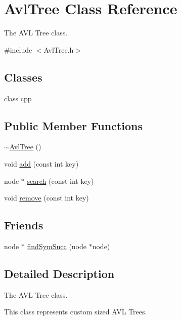 \hypertarget{classAvlTree}{\section{Avl\-Tree Class Reference}
\label{classAvlTree}
}


The A\-V\-L Tree class.  




{\ttfamily \#include $<$Avl\-Tree.\-h$>$}

\subsection*{Classes}
\begin{DoxyCompactItemize}
\item 
class \hyperlink{classAvlTree_1_1cpp}{cpp}
\end{DoxyCompactItemize}
\subsection*{Public Member Functions}
\begin{DoxyCompactItemize}
\item 
\hyperlink{classAvlTree_ada89cb30925d36a56e3aab8768752468}{$\sim$\-Avl\-Tree} ()
\item 
void \hyperlink{classAvlTree_a8ef63ed11092c12589dca726ee20132b}{add} (const int key)
\item 
node $\ast$ \hyperlink{classAvlTree_ab2ca84658574e6a199273eb835c93bf8}{search} (const int key)
\item 
void \hyperlink{classAvlTree_a20c8f808bd2b6a6f8b459fa24f09a15c}{remove} (const int key)
\end{DoxyCompactItemize}
\subsection*{Friends}
\begin{DoxyCompactItemize}
\item 
node $\ast$ \hyperlink{classAvlTree_aa44539c647f5a99a52391ce61d96d759}{find\-Sym\-Succ} (node $\ast$node)
\end{DoxyCompactItemize}


\subsection{Detailed Description}
The A\-V\-L Tree class. 

This class represents custom sized A\-V\-L Trees. 

